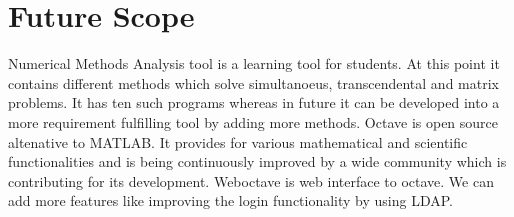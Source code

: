 \section{Future Scope}
Numerical Methods Analysis tool is a learning tool for students. At this point it contains different methods which solve simultanoeus, transcendental and matrix problems.
It has ten such programs whereas in future it can be developed into a more requirement fulfilling tool by adding more methods. Octave is open source altenative to MATLAB.
It provides for various mathematical and scientific functionalities and is being continuously improved by a wide community which is contributing for its development. Weboctave is web interface to octave. We can add more features like improving the login functionality by using LDAP.

